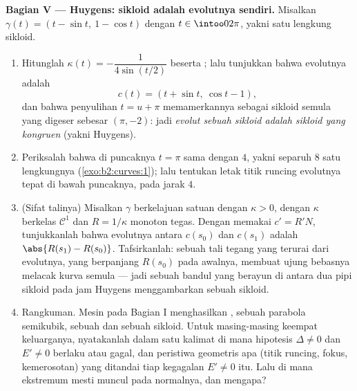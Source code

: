 \begin{problem}
\medskip
\noindent\textbf{Bagian V --- Huygens: sikloid adalah evolutnya
sendiri.} Misalkan $\gamma(t) = (t - \sin t,\ 1 - \cos t)$ dengan $t \in
\intoo0{2\pi}$, yakni satu lengkung sikloid.
\begin{enumerate}[resume]
  \item Hitunglah $\kappa(t) = -\dfrac1{4\sin(t/2)}$ beserta
        ; lalu tunjukkan bahwa evolutnya adalah
        \[
        c(t) = (t + \sin t,\ \cos t - 1),
        \]
        dan bahwa penyulihan $t = u + \pi$ memamerkannya
        sebagai sikloid semula yang digeser sebesar $(\pi, -2)$:
        jadi \emph{evolut sebuah sikloid adalah sikloid yang
        kongruen} (yakni Huygens).
  \item Periksalah bahwa  di puncaknya $t =
        \pi$ sama dengan $4$, yakni separuh  $8$ satu
        lengkungnya (\cref{exo:b2:curves:1}); lalu tentukan letak titik runcing
        evolutnya tepat di bawah puncaknya, pada jarak $4$.
  \item (Sifat talinya) Misalkan $\gamma$ berkelajuan satuan dengan
        $\kappa > 0$, dengan $\kappa$ berkelas $\mathcal C^1$ dan
        $R = 1/\kappa$ monoton tegas. Dengan memakai $c' = R'N$,
        tunjukkanlah bahwa  evolutnya antara
        $c(s_0)$ dan $c(s_1)$ adalah $\abs{R(s_1) - R(s_0)}$.
        Tafsirkanlah: sebuah tali tegang yang terurai dari evolutnya,
        yang berpanjang $R(s_0)$ pada awalnya, membuat ujung bebasnya
        melacak kurva semula --- jadi sebuah bandul yang berayun
        di antara dua pipi sikloid pada jam Huygens
        menggambarkan sebuah sikloid.
  \item Rangkuman. Mesin pada Bagian I menghasilkan
        , sebuah parabola semikubik, sebuah  dan sebuah
        sikloid. Untuk masing-masing keempat keluarganya, nyatakanlah dalam satu
        kalimat di mana hipotesis $\Delta \neq 0$ dan
        $E' \neq 0$ berlaku atau gagal, dan peristiwa geometris apa
        (titik runcing, fokus, kemerosotan) yang ditandai tiap kegagalan $E' \neq 0$
        itu. Lalu di mana ekstremum  mesti muncul pada
         normalnya, dan mengapa?

\end{enumerate}
\end{problem}
